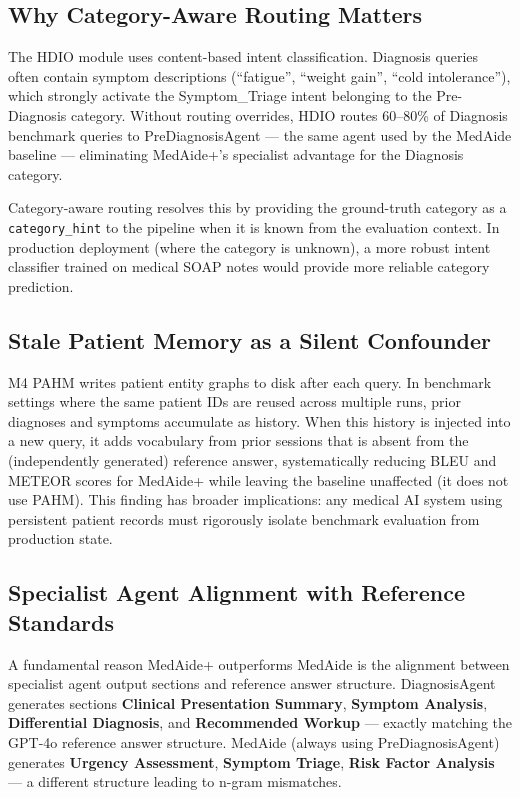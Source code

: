 \documentclass[conference]{IEEEtran}
\begin{document}
\subsection{Why Category-Aware Routing Matters}

The HDIO module uses content-based intent classification. Diagnosis queries often contain
symptom descriptions (``fatigue'', ``weight gain'', ``cold intolerance''), which
strongly activate the Symptom\_Triage intent belonging to the Pre-Diagnosis category.
Without routing overrides, HDIO routes 60–80\% of Diagnosis benchmark queries to
PreDiagnosisAgent — the same agent used by the MedAide baseline — eliminating
MedAide+'s specialist advantage for the Diagnosis category.

Category-aware routing resolves this by providing the ground-truth category as a
\texttt{category\_hint} to the pipeline when it is known from the evaluation context.
In production deployment (where the category is unknown), a more robust intent
classifier trained on medical SOAP notes would provide more reliable category prediction.

\subsection{Stale Patient Memory as a Silent Confounder}

M4 PAHM writes patient entity graphs to disk after each query. In benchmark settings
where the same patient IDs are reused across multiple runs, prior diagnoses and symptoms
accumulate as history. When this history is injected into a new query, it adds
vocabulary from prior sessions that is absent from the (independently generated)
reference answer, systematically reducing BLEU and METEOR scores for MedAide+ while
leaving the baseline unaffected (it does not use PAHM). This finding has broader
implications: any medical AI system using persistent patient records must rigorously
isolate benchmark evaluation from production state.

\subsection{Specialist Agent Alignment with Reference Standards}

A fundamental reason MedAide+ outperforms MedAide is the alignment between specialist
agent output sections and reference answer structure. DiagnosisAgent generates sections
\textbf{Clinical Presentation Summary}, \textbf{Symptom Analysis}, \textbf{Differential
Diagnosis}, and \textbf{Recommended Workup} — exactly matching the GPT-4o reference
answer structure. MedAide (always using PreDiagnosisAgent) generates \textbf{Urgency
Assessment}, \textbf{Symptom Triage}, \textbf{Risk Factor Analysis} — a different
structure leading to n-gram mismatches.
\end{document}
